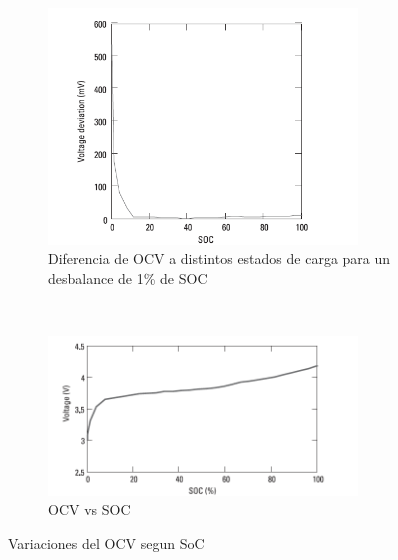 \documentclass[10pt,a4paper]{article}
\begin{document}
	\begin{figure}[h!]
            \begin{subfigure}[t]{.5\textwidth}
            \begin{center}
                \includegraphics[width=0.9\textwidth]{diff_imbalance.png}
                \caption{Diferencia de OCV a distintos estados de carga para un desbalance de 1\% de SOC}
                \label{diff_imbalance}
            \end{center}
        \end{subfigure}%
            ~
    	\begin{subfigure}[t]{.5\textwidth}
    		\begin{center}
    			\includegraphics[width=0.9\textwidth]{SOC_vs_OCV_equalization.png}
    			\caption{OCV vs SOC}
    			\label{OCV_SOC_equalization_figure}
    		\end{center}
    	\end{subfigure}
        \caption{Variaciones del OCV segun SoC}
        \label{rep_OCV_SOC}
    \end{figure}
	\FloatBarrier
\end{document}

